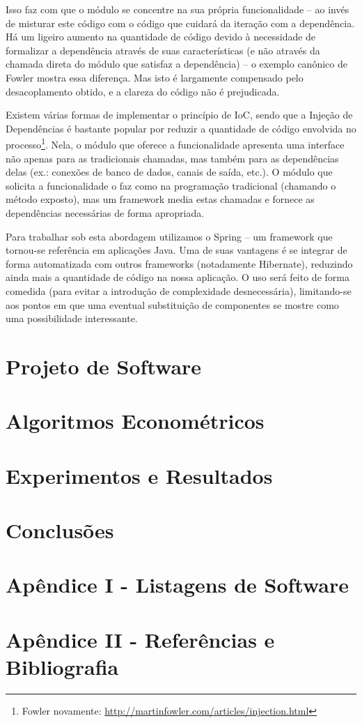 \documentclass[11pt]{book}
\begin{document}
Isso faz com que o módulo se concentre na sua própria funcionalidade – ao invés de misturar este código com o código que cuidará da iteração com a dependência. Há um ligeiro aumento na quantidade de código devido à necessidade de formalizar a dependência através de suas características (e não através da chamada direta do módulo que satisfaz a dependência) – o exemplo canônico de Fowler mostra essa diferença. Mas isto é largamente compensado pelo desacoplamento obtido, e a clareza do código não é prejudicada.

Existem várias formas de implementar o princípio de IoC, sendo que a Injeção de Dependências é bastante popular por reduzir a quantidade de código envolvida no processo\footnote{Fowler novamente: \url{http://martinfowler.com/articles/injection.html}}. Nela, o módulo que oferece a funcionalidade apresenta uma interface não apenas para as tradicionais chamadas, mas também para as dependências delas (ex.: conexões de banco de dados, canais de saída, etc.). O módulo que solicita a funcionalidade o faz como na programação tradicional (chamando o método exposto), mas um framework media estas chamadas e fornece as dependências necessárias de forma apropriada.

Para trabalhar sob esta abordagem utilizamos o Spring – um framework que tornou-se referência em aplicações Java. Uma de suas vantagens é se integrar de forma automatizada com outros frameworks (notadamente Hibernate), reduzindo ainda mais a quantidade de código na nossa aplicação. O uso será feito de forma comedida (para evitar a introdução de complexidade desnecessária), limitando-se aos pontos em que uma eventual substituição de componentes se mostre como uma possibilidade interessante.

\chapter {Projeto de Software}

\chapter {Algoritmos Econométricos}

\chapter {Experimentos e Resultados}

\chapter {Conclusões}

\chapter * {Apêndice I - Listagens de Software}
\chapter * {Apêndice II - Referências e Bibliografia}
\end{document}
